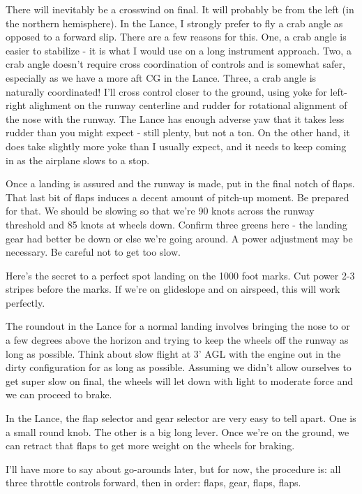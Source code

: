 There will inevitably be a crosswind on final. It will probably be from the left (in the northern hemisphere). In the Lance, I strongly prefer to fly a crab angle as opposed to a forward slip. There are a few reasons for this. One, a crab angle is easier to stabilize - it is what I would use on a long instrument approach. Two, a crab angle doesn't require cross coordination of controls and is somewhat safer, especially as we have a more aft CG in the Lance. Three, a crab angle is naturally coordinated! I'll cross control closer to the ground, using yoke for left-right alighment on the runway centerline and rudder for rotational alignment of the nose with the runway. The Lance has enough adverse yaw that it takes less rudder than you might expect - still plenty, but not a ton. On the other hand, it does take slightly more yoke than I usually expect, and it needs to keep coming in as the airplane slows to a stop.

Once a landing is assured and the runway is made, put in the final notch of flaps. That last bit of flaps induces a decent amount of pitch-up moment. Be prepared for that. We should be slowing so that we're 90 knots across the runway threshold and 85 knots at wheels down. Confirm three greens here - the landing gear had better be down or else we're going around. A power adjustment may be necessary. Be careful not to get too slow.

Here's the secret to a perfect spot landing on the 1000 foot marks. Cut power 2-3 stripes before the marks. If we're on glideslope and on airspeed, this will work perfectly.

The roundout in the Lance for a normal landing involves bringing the nose to or a few degrees above the horizon and trying to keep the wheels off the runway as long as possible. Think about slow flight at 3' AGL with the engine out in the dirty configuration for as long as possible. Assuming we didn't allow ourselves to get super slow on final, the wheels will let down with light to moderate force and we can proceed to brake.

In the Lance, the flap selector and gear selector are very easy to tell apart. One is a small round knob. The other is a big long lever. Once we're on the ground, we can retract that flaps to get more weight on the wheels for braking.

I'll have more to say about go-arounds later, but for now, the procedure is: all three throttle controls forward, then in order: flaps, gear, flaps, flaps.

